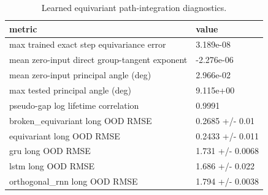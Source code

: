 \begin{table}[t]
\centering
\small
\caption{Learned equivariant path-integration diagnostics.}
\label{tab:learned-diagnostics}
\begin{tabular}{ll}
\toprule
metric & value \\
\midrule
max trained exact step equivariance error & 3.189e-08 \\
mean zero-input direct group-tangent exponent & -2.276e-06 \\
mean zero-input principal angle (deg) & 2.966e-02 \\
max tested principal angle (deg) & 9.115e+00 \\
pseudo-gap log lifetime correlation & 0.9991 \\
broken\_equivariant long OOD RMSE & 0.2685 +/- 0.01 \\
equivariant long OOD RMSE & 0.2433 +/- 0.011 \\
gru long OOD RMSE & 1.731 +/- 0.0068 \\
lstm long OOD RMSE & 1.686 +/- 0.022 \\
orthogonal\_rnn long OOD RMSE & 1.794 +/- 0.0038 \\
\bottomrule
\end{tabular}
\end{table}
